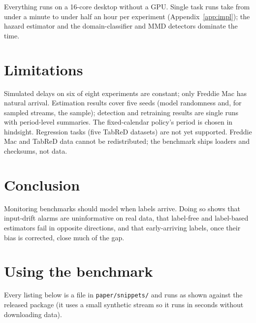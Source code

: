 \documentclass[11pt]{article}
\begin{document}
Everything runs on a 16-core desktop without a GPU. Single task runs take from under a minute to
under half an hour per experiment (Appendix~\ref{app:impl}); the hazard estimator and the
domain-classifier and MMD detectors dominate the time.

\section{Limitations}

Simulated delays on six of eight experiments are constant; only Freddie Mac has natural arrival.
Estimation results cover five seeds (model randomness and, for sampled streams, the sample);
detection and retraining results are single runs with period-level summaries. The
fixed-calendar policy's period is chosen in hindsight. Regression tasks (five TabReD datasets)
are not yet supported. Freddie Mac and TabReD data cannot be redistributed; the benchmark ships
loaders and checksums, not data.

\section{Conclusion}

Monitoring benchmarks should model when labels arrive. Doing so shows that input-drift alarms
are uninformative on real data, that label-free and label-based estimators fail in opposite
directions, and that early-arriving labels, once their bias is corrected, close much of the gap.




\clearpage
\appendix

\section{Using the benchmark}\label{app:code}

Every listing below is a file in \texttt{paper/snippets/} and runs as shown against the released
package (it uses a small synthetic stream so it runs in seconds without downloading data).




\end{document}
